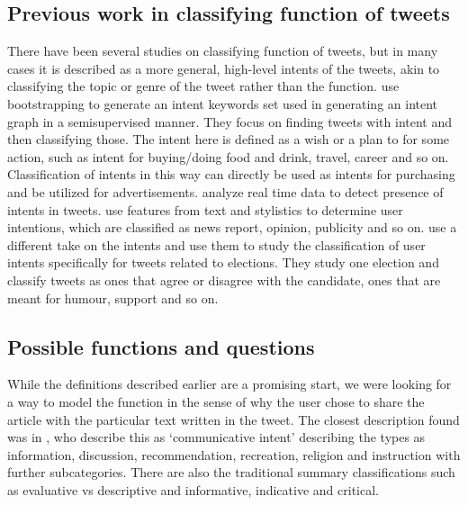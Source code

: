 \subsection{Previous work in classifying function of tweets}
There have been several studies on classifying function of tweets, but in many cases it is described as a more general, high-level intents of the tweets, akin to classifying the topic or genre of the tweet rather than the function. \cite{wang2015mining} use bootstrapping to generate an intent keywords set used in generating an intent graph in a semisupervised manner. They focus on finding tweets with intent and then classifying those. The intent here is defined as a wish or a plan to for some action, such as intent for buying/doing food and drink, travel, career and so on. Classification of intents in this way can directly be used as intents for purchasing and be utilized for advertisements.  \citet{banerjee2012towards} analyze real time data to detect presence of intents in tweets. \citet{gomez2014content} use features from text and stylistics to determine user intentions, which are classified as news report, opinion, publicity and so on. \cite{mohammad2013identifying} use a different take on the intents and use them to study the classification of user intents specifically for tweets related to elections. They study one election and classify tweets as ones that agree or disagree with the candidate, ones that are meant for humour, support and so on. 


\subsection{Possible functions and questions}

While the definitions described earlier are a promising start, we were looking for a way to model the function in the sense of why the user chose to share the article with the particular text written in the tweet. The closest description found was in \cite{sinclair1996preliminary}, who describe this as `communicative intent' describing the types as information, discussion, recommendation, recreation, religion and instruction with further subcategories. There are also the traditional summary classifications such as evaluative vs descriptive and informative, indicative and critical. 

